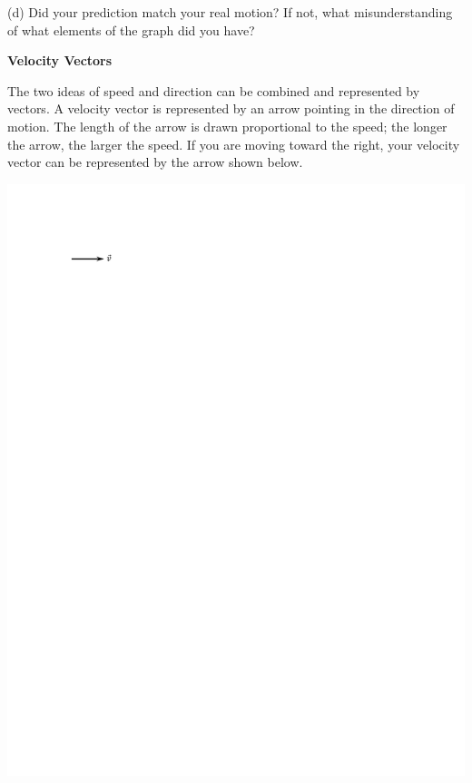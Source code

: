 (d) Did your prediction match your real motion? If not, what misunderstanding
of what elements of the graph did you have?
\answerspace{20mm}

\pagebreak[2]
\textbf{Velocity Vectors} 

The two ideas of speed and direction can be combined and represented by vectors.
A velocity vector is represented by an arrow pointing in the direction of motion.
The length of the arrow is drawn proportional to the speed; the longer the arrow,
the larger the speed. If you are moving toward the right, your velocity vector
can be represented by the arrow shown below.

\vspace{0.3cm}
{\par\centering \includegraphics{velocity/velocity_vector.pdf} \par}
\vspace{0.3cm}

